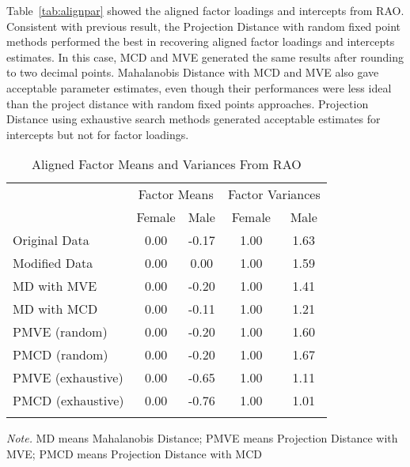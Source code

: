 \documentclass[
  man]{apa7}
\begin{document}
Table~\ref{tab:alignpar} showed the aligned factor loadings and intercepts from RAO. Consistent with previous result, the Projection Distance with random fixed point methods performed the best in recovering aligned factor loadings and intercepts estimates. In this case, MCD and MVE generated the same results after rounding to two decimal points. Mahalanobis Distance with MCD and MVE also gave acceptable parameter estimates, even though their performances were less ideal than the project distance with random fixed points approaches. Projection Distance using exhaustive search methods generated acceptable estimates for intercepts but not for factor loadings.

\begin{table}[tbp]

\begin{center}
\begin{threeparttable}

\caption{\label{tab:mvar}Aligned Factor Means and Variances From RAO}

\begin{tabular}{lcccc}
\toprule
 & \multicolumn{2}{c}{Factor Means} & \multicolumn{2}{c}{Factor Variances} \\
\cmidrule(r){2-3} \cmidrule(r){4-5}
 & \multicolumn{1}{c}{Female} & \multicolumn{1}{c}{Male} & \multicolumn{1}{c}{Female} & \multicolumn{1}{c}{Male}\\
\midrule
Original Data & 0.00 & -0.17 & 1.00 & 1.63\\
Modified Data & 0.00 & 0.00 & 1.00 & 1.59\\
MD with MVE & 0.00 & -0.20 & 1.00 & 1.41\\
MD with MCD & 0.00 & -0.11 & 1.00 & 1.21\\
PMVE (random) & 0.00 & -0.20 & 1.00 & 1.60\\
PMCD (random) & 0.00 & -0.20 & 1.00 & 1.67\\
PMVE (exhaustive) & 0.00 & -0.65 & 1.00 & 1.11\\
PMCD (exhaustive) & 0.00 & -0.76 & 1.00 & 1.01\\
\bottomrule
\addlinespace
\end{tabular}

\begin{tablenotes}[para]
\normalsize{\textit{Note.} MD means Mahalanobis Distance; PMVE means Projection Distance with MVE; PMCD means Projection Distance with MCD}
\end{tablenotes}

\end{threeparttable}
\end{center}

\end{table}
\end{document}
